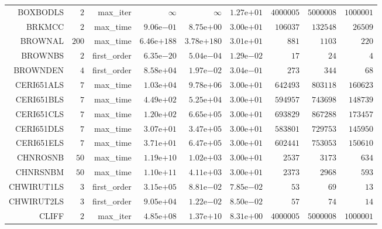 \begin{longtable}{rrrrrrrrr}
BOXBODLS & \(     2\) & max\_iter & \(\infty\) & \(\infty\) & \( 1.27\)e\(+01\) & \(4000005\) & \(5000008\) & \(1000001\) \\
BRKMCC & \(     2\) & max\_time & \( 9.06\)e\(-01\) & \( 8.75\)e\(+00\) & \( 3.00\)e\(+01\) & \(106037\) & \(132548\) & \( 26509\) \\
BROWNAL & \(   200\) & max\_time & \(6.46\)e\(+188\) & \(3.78\)e\(+180\) & \( 3.01\)e\(+01\) & \(   881\) & \(  1103\) & \(   220\) \\
BROWNBS & \(     2\) & first\_order & \( 6.35\)e\(-20\) & \( 5.04\)e\(-04\) & \( 1.29\)e\(-02\) & \(    17\) & \(    24\) & \(     4\) \\
BROWNDEN & \(     4\) & first\_order & \( 8.58\)e\(+04\) & \( 1.97\)e\(-02\) & \( 3.04\)e\(-01\) & \(   273\) & \(   344\) & \(    68\) \\
CERI651ALS & \(     7\) & max\_time & \( 1.03\)e\(+04\) & \( 9.78\)e\(+06\) & \( 3.00\)e\(+01\) & \(642493\) & \(803118\) & \(160623\) \\
CERI651BLS & \(     7\) & max\_time & \( 4.49\)e\(+02\) & \( 5.25\)e\(+04\) & \( 3.00\)e\(+01\) & \(594957\) & \(743698\) & \(148739\) \\
CERI651CLS & \(     7\) & max\_time & \( 1.20\)e\(+02\) & \( 6.65\)e\(+05\) & \( 3.00\)e\(+01\) & \(693829\) & \(867288\) & \(173457\) \\
CERI651DLS & \(     7\) & max\_time & \( 3.07\)e\(+01\) & \( 3.47\)e\(+05\) & \( 3.00\)e\(+01\) & \(583801\) & \(729753\) & \(145950\) \\
CERI651ELS & \(     7\) & max\_time & \( 3.71\)e\(+01\) & \( 6.47\)e\(+05\) & \( 3.00\)e\(+01\) & \(602441\) & \(753053\) & \(150610\) \\
CHNROSNB & \(    50\) & max\_time & \( 1.19\)e\(+10\) & \( 1.02\)e\(+03\) & \( 3.00\)e\(+01\) & \(  2537\) & \(  3173\) & \(   634\) \\
CHNRSNBM & \(    50\) & max\_time & \( 1.10\)e\(+11\) & \( 4.11\)e\(+03\) & \( 3.00\)e\(+01\) & \(  2373\) & \(  2968\) & \(   593\) \\
CHWIRUT1LS & \(     3\) & first\_order & \( 3.15\)e\(+05\) & \( 8.81\)e\(-02\) & \( 7.85\)e\(-02\) & \(    53\) & \(    69\) & \(    13\) \\
CHWIRUT2LS & \(     3\) & first\_order & \( 9.05\)e\(+04\) & \( 1.22\)e\(-02\) & \( 8.50\)e\(-02\) & \(    57\) & \(    74\) & \(    14\) \\
CLIFF & \(     2\) & max\_iter & \( 4.85\)e\(+08\) & \( 1.37\)e\(+10\) & \( 8.31\)e\(+00\) & \(4000005\) & \(5000008\) & \(1000001\) \\

\end{longtable}
